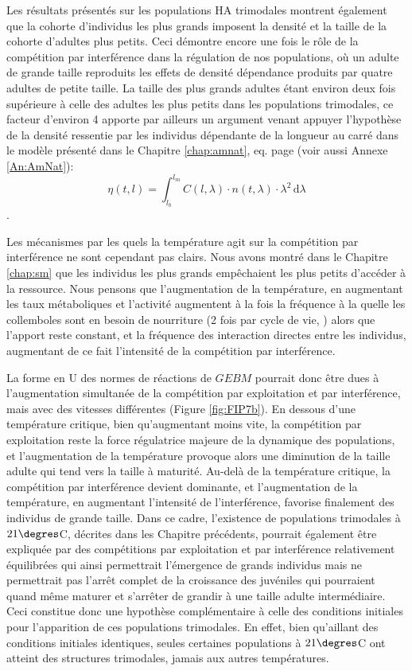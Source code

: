 Les résultats présentés sur les populations HA trimodales montrent également que
la cohorte d'individus les plus grands imposent la densité et la taille de la
cohorte d'adultes plus petits. Ceci démontre encore une fois le rôle de la
compétition par interférence dans la régulation de nos populations, où un
adulte de grande taille reproduits les effets de densité dépendance produits par
quatre adultes de petite taille. La taille des plus grands adultes étant environ
deux fois supérieure à celle des adultes les plus petits dans les populations
trimodales, ce facteur d'environ 4 apporte par ailleurs un argument venant
appuyer l'hypothèse de la densité ressentie par les individus dépendante de la
longueur au carré dans le modèle présenté dans le Chapitre \ref{chap:amnat}, eq.
 page \pageref{eq_an2} (voir aussi Annexe \ref{An:AmNat}): $$
\eta(t,l)=\int_{l_b}^{l_m} \! C(l,\lambda)\cdot n(t,\lambda)\cdot\lambda^2\, \mathrm{d}\lambda $$.

Les mécanismes par les quels la température agit sur la compétition par
interférence ne sont cependant pas clairs. Nous avons montré dans le Chapitre
\ref{chap:sm} que les individus les plus grands empêchaient les plus petits
d'accéder à la ressource. Nous pensons que l'augmentation de la température, en
augmentant les taux métaboliques et l'activité augmentent à la fois la fréquence
à la quelle les collemboles sont en besoin de nourriture (2 fois par cycle de
vie, \citealp{palevody1974a}) alors que l'apport reste constant, et la fréquence
des interaction directes entre les individus, augmentant de ce fait l'intensité
de la compétition par interférence. 

La forme en U des normes de réactions de $GEBM$ pourrait donc être dues à
l'augmentation simultanée de la compétition par exploitation et par
interférence, mais avec des vitesses différentes (Figure \ref{fig:FIP7b}). En
dessous d'une température critique, bien qu'augmentant moins vite, la
compétition par exploitation reste la force régulatrice majeure de la dynamique
des populations, et l'augmentation de la température provoque alors une
diminution de la taille adulte qui tend vers la taille à maturité. Au-delà de la
température critique, la compétition par interférence devient dominante, et
l'augmentation de la température, en augmentant l'intensité de l'interférence,
favorise finalement des individus de grande taille. Dans ce cadre, l'existence
de populations trimodales à $21\degres$C, décrites dans les Chapitre précédents,
pourrait également être expliquée par des compétitions par exploitation et par
interférence relativement équilibrées qui ainsi permettrait l'émergence de
grands individus mais ne permettrait pas l'arrêt complet de la croissance des
juvéniles qui pourraient quand même maturer et s'arrêter de grandir à une taille
adulte intermédiaire. Ceci constitue donc une hypothèse complémentaire à
celle des conditions initiales pour l'apparition de ces populations trimodales.
En effet, bien qu'aillant des conditions initiales identiques, seules certaines
populations à $21\degres$C ont atteint des structures trimodales, jamais aux
autres températures. 

